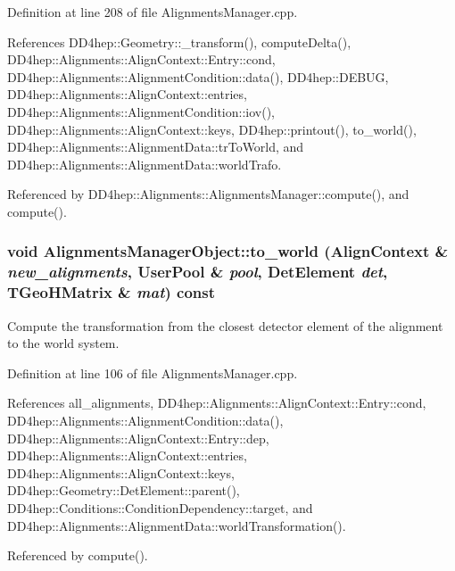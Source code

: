 Definition at line 208 of file AlignmentsManager.cpp.

References DD4hep::Geometry::\_\-transform(), computeDelta(), DD4hep::Alignments::AlignContext::Entry::cond, DD4hep::Alignments::AlignmentCondition::data(), DD4hep::DEBUG, DD4hep::Alignments::AlignContext::entries, DD4hep::Alignments::AlignmentCondition::iov(), DD4hep::Alignments::AlignContext::keys, DD4hep::printout(), to\_\-world(), DD4hep::Alignments::AlignmentData::trToWorld, and DD4hep::Alignments::AlignmentData::worldTrafo.

Referenced by DD4hep::Alignments::AlignmentsManager::compute(), and compute().\hypertarget{class_d_d4hep_1_1_alignments_1_1_alignments_manager_object_a69d0f7c21afe5cdd6d34a8c8e460f285}{
\subsubsection[{to\_\-world}]{\setlength{\rightskip}{0pt plus 5cm}void AlignmentsManagerObject::to\_\-world ({\bf AlignContext} \& {\em new\_\-alignments}, \/  UserPool \& {\em pool}, \/  {\bf DetElement} {\em det}, \/  TGeoHMatrix \& {\em mat}) const}}
\label{class_d_d4hep_1_1_alignments_1_1_alignments_manager_object_a69d0f7c21afe5cdd6d34a8c8e460f285}


Compute the transformation from the closest detector element of the alignment to the world system. 

Definition at line 106 of file AlignmentsManager.cpp.

References all\_\-alignments, DD4hep::Alignments::AlignContext::Entry::cond, DD4hep::Alignments::AlignmentCondition::data(), DD4hep::Alignments::AlignContext::Entry::dep, DD4hep::Alignments::AlignContext::entries, DD4hep::Alignments::AlignContext::keys, DD4hep::Geometry::DetElement::parent(), DD4hep::Conditions::ConditionDependency::target, and DD4hep::Alignments::AlignmentData::worldTransformation().

Referenced by compute().

